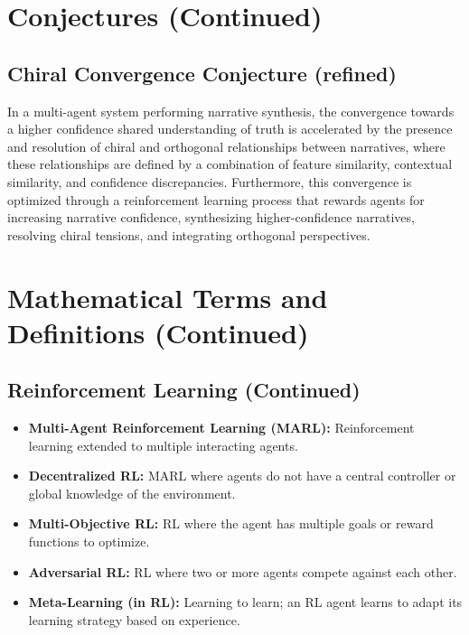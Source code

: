 \documentclass[12pt, a4paper]{article}
\begin{document}
\section{Conjectures (Continued)}

\subsection{Chiral Convergence Conjecture (refined)}

In a multi-agent system performing narrative synthesis, the convergence towards a higher confidence shared understanding of truth is accelerated by the presence and resolution of chiral and orthogonal relationships between narratives, where these relationships are defined by a combination of feature similarity, contextual similarity, and confidence discrepancies.  Furthermore, this convergence is optimized through a reinforcement learning process that rewards agents for increasing narrative confidence, synthesizing higher-confidence narratives, resolving chiral tensions, and integrating orthogonal perspectives.


 
 
 
 
 
 
 
 
 
 
 
 
 
 
 
 
\section{Mathematical Terms and Definitions (Continued)}

\subsection{Reinforcement Learning (Continued)}

\begin{itemize}
    \item \textbf{Multi-Agent Reinforcement Learning (MARL): } Reinforcement learning extended to multiple interacting agents.
    \item \textbf{Decentralized RL: } MARL where agents do not have a central controller or global knowledge of the environment.
    \item \textbf{Multi-Objective RL: } RL where the agent has multiple goals or reward functions to optimize.
    \item \textbf{Adversarial RL: } RL where two or more agents compete against each other.
    \item \textbf{Meta-Learning (in RL): }  Learning to learn;  an RL agent learns to adapt its learning strategy based on experience.
\end{itemize}
\end{document}
